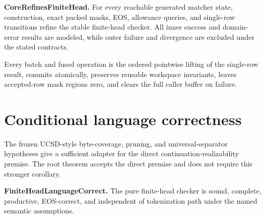 \begin{theorem}
  \label{thm:core-refines-finite-head}
  \notready
  \textbf{CoreRefinesFiniteHead.}
  For every reachable generated matcher state, construction, exact packed
  masks, EOS, allowance queries, and single-row transitions refine the stable
  finite-head checker.  All inner success and domain-error results are modeled,
  while outer failure and divergence are excluded under the stated contracts.
\end{theorem}

\begin{theorem}
  \label{thm:batch-runtime-correct}
  \notready
  Every batch and fused operation is the ordered pointwise lifting of the
  single-row result, commits atomically, preserves reusable workspace
  invariants, leaves accepted-row mask regions zero, and clears the full caller
  buffer on failure.
\end{theorem}

\section{Conditional language correctness}

\begin{proposition}
  \label{prop:realizability-adapter}
  \notready
  The frozen UCSD-style byte-coverage, pruning, and universal-separator
  hypotheses give a sufficient adapter for the direct continuation-realizability
  premise.  The root theorem accepts the direct premise and does not require
  this stronger corollary.
\end{proposition}

\begin{theorem}
  \label{thm:finite-head-language-correct}
  \notready
  \textbf{FiniteHeadLanguageCorrect.}
  The pure finite-head checker is sound, complete, productive, EOS-correct, and
  independent of tokenization path under the named semantic assumptions.
\end{theorem}

